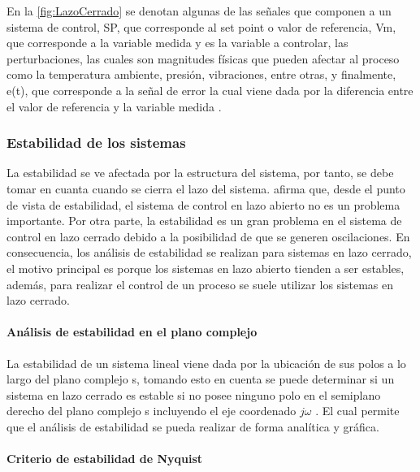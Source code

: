 			En la \cref{fig:LazoCerrado} se denotan algunas de las señales que componen a un sistema de control, SP, que corresponde al set point o valor de referencia, Vm, que corresponde a la variable medida y es la variable a controlar, las perturbaciones, las cuales son magnitudes físicas que pueden afectar al proceso como la temperatura ambiente, presión, vibraciones, entre otras, y finalmente, e(t), que corresponde a la señal de error la cual viene dada por la diferencia entre el valor de referencia y la variable medida \Parencite{maloney2006electronica}.
			
			
		\subsubsection{Estabilidad de los sistemas}

		La estabilidad se ve afectada por la estructura del sistema, por tanto, se debe tomar en cuanta cuando se cierra el lazo del sistema. \textcite{ogata2003ingenieria} afirma que, desde el punto de vista de estabilidad, el sistema de control en lazo abierto no es un problema importante. Por otra parte, la estabilidad es un gran problema en el sistema de control en lazo cerrado debido a la posibilidad de que se generen oscilaciones. En consecuencia, los análisis de estabilidad se realizan para sistemas en lazo cerrado, el motivo principal es porque los sistemas en lazo abierto tienden a ser estables, además, para realizar el control de un proceso se suele utilizar los sistemas en lazo cerrado.

			\paragraph{Análisis de estabilidad en el plano complejo}
			
				La estabilidad de un sistema lineal viene dada por la ubicación de sus polos a lo largo del plano complejo s, tomando esto en cuenta se puede determinar si un sistema en lazo cerrado es estable si no posee ninguno polo en el semiplano derecho del plano complejo s incluyendo el eje coordenado $j\omega$ \Parencite{ogata2003ingenieria}. El cual permite que el análisis de estabilidad se pueda realizar de forma analítica y gráfica.
			
			\paragraph{Criterio de estabilidad de Nyquist}
				
